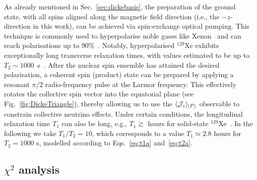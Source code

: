 \documentclass[aps,prd,10pt,twocolumn,superscriptaddress,floatfix,nofootinbib,amsmath,amssymb,altaffilletter,preprintnumbers]{revtex4-1}
\begin{document}
As already mentioned in Sec.~\ref{sec:dickebasis},
the preparation of the ground state, with all spins aligned along the magnetic field direction (i.e., the $-z$-direction in this work), can be achieved via spin-exchange optical pumping.  This technique  is commonly used to hyperpolarise noble gases like Xenon~\cite{PhysRevLett.87.067601,RevModPhys.69.629} and can reach polarisations up to 90\%~\cite{doi:10.1021/jp501493k}. Notably, hyperpolarised $^{129}$Xe exhibits exceptionally long transverse relaxation times, with values estimated to be up to $T_2\sim 1000$~s~\cite{PhysRevLett.87.067601, Walter:2025ldb}.  
After the nuclear spin ensemble has attained the desired polarisation,
a coherent spin (product) state can be prepared by applying a resonant $\pi/2$ radio-frequency  pulse at the Larmor frequency. This effectively rotates the collective spin vector into the equatorial plane (see Fig.~\ref{fig:DickeTriangle}), thereby allowing us to use the $\langle {\cal J}_z \rangle_{|P \rangle}$ observable to constrain collective neutrino effects. Under certain conditions, the longitudinal relaxation time  $T_1$ can also be long, e.g., $T_1\gtrsim $ hours for solid-state $^{129}$Xe~\cite{PhysRevB.94.094309}. In the following we take $T_1/T_2=10$, which corresponds to a value $T_1\simeq 2.8$ hours for $T_2=1000$ s, modelled according to Eqs.~\eqref{eq:t1a} and~\eqref{eq:t2a}.



\subsection{\texorpdfstring{$\chi^2$}{chi} analysis}
\end{document}
